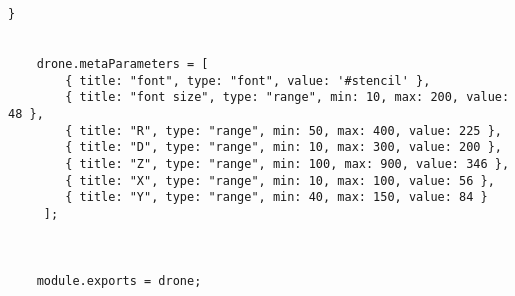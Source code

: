 \documentclass[11pt]{article}
\begin{document}
\begin{lstlisting}
}

                                          
    drone.metaParameters = [
        { title: "font", type: "font", value: '#stencil' },
        { title: "font size", type: "range", min: 10, max: 200, value: 48 },
        { title: "R", type: "range", min: 50, max: 400, value: 225 },
        { title: "D", type: "range", min: 10, max: 300, value: 200 },
        { title: "Z", type: "range", min: 100, max: 900, value: 346 },
        { title: "X", type: "range", min: 10, max: 100, value: 56 },
        { title: "Y", type: "range", min: 40, max: 150, value: 84 }
     ];
                           


    module.exports = drone;

\end{lstlisting}
\end{document}
